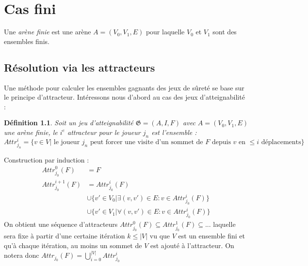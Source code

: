 \documentclass[12pt,a4paper,oneside, titlepage]{report}
\newtheorem{defi}{D\'efinition}[section]
\begin{document}
\chapter{Cas fini}
\renewcommand{\leftmark}{CHAPITRE \thechapter.~~Cas fini}
Une \emph{arène finie} est une arène $A=(V_0, V_1, E)$ pour laquelle $V_0$ et $V_1$ sont des ensembles finis.
\section*{Résolution via les attracteurs}
Une méthode pour calculer les ensembles gagnants des jeux de sûreté se base sur le principe d'attracteur. Intéressons nous d'abord au cas des jeux d'atteignabilité :
\begin{defi}
	Soit un jeu d'atteignabilité $\mathfrak{G} = (A, I, F)$ avec $A=(V_0, V_1, E)$ une arène finie, le $i^e$ attracteur pour le joueur $j_n$ est l'ensemble :\\
	$Attr_{j_n}^i=\{v\in V|\text{ le joueur }j_n\text{ peut forcer une visite d'un sommet de }F\text{ depuis }v\text{ en } \leq  i \text{ déplacements}\}$
\end{defi}

\noindent Construction par induction :
\begin{equation}
\begin{split}
Attr^0_{j_0}(F)&=F\\
Attr^{i+1}_{j_0}(F)&=Attr^i_{j_0}(F)\\
			&\cup \{v'\in V_0|\exists(v,v')\in E:v\in Attr^i_{j_0}(F)\}\\
			&\cup \{v'\in V_1|\forall(v,v')\in E:v\in Attr^i_{j_0}(F)\}
\end{split}
\end{equation}
On obtient une séquence d'attracteurs $Attr_{j_0}^0(F)\subseteq Attr_{j_0}^1(F) \subseteq ...$ laquelle sera fixe à partir d'une certaine itération $k\leq|V|$ vu que $V$ est un ensemble fini et qu'à chaque itération, au moins un sommet de $V$ est ajouté à l'attracteur. On notera donc $Attr_{j_0}(F)=\bigcup_{i=0}^{|V|}Attr_{j_0}^i$\\
\end{document}
